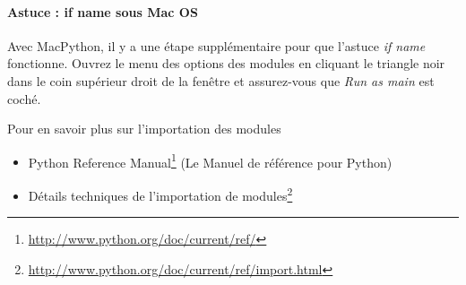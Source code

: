 \paragraph*{Astuce : if name sous Mac OS}
Avec MacPython, il y a une étape supplémentaire pour que l'astuce \emph{if name} fonctionne. Ouvrez le menu des options des modules en cliquant le triangle noir dans le coin supérieur droit de la fenêtre et assurez-vous que \emph{Run as main} est coché.

\medskip
\noindent Pour en savoir plus sur l'importation des modules

\begin{itemize}
    \item{Python Reference Manual\footnote{\url{http://www.python.org/doc/current/ref/}} (Le Manuel de référence pour Python)}
    \item{Détails techniques de l'importation de modules\footnote{\url{http://www.python.org/doc/current/ref/import.html}}}
\end{itemize}
